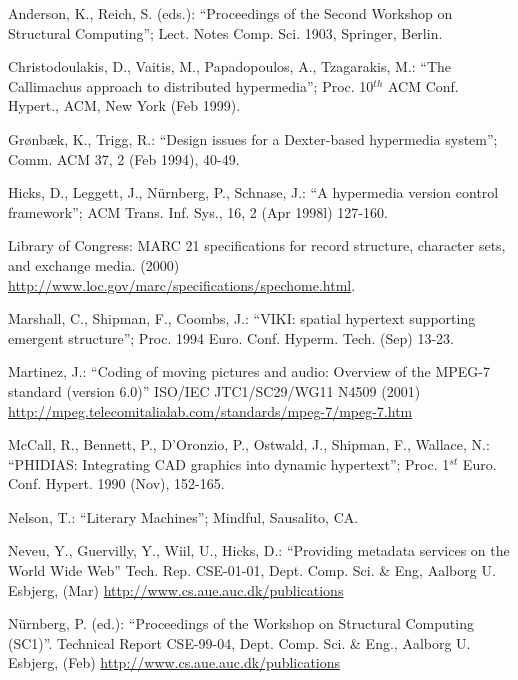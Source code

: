 \documentclass[10pt, a4paper, oneside]{article}
\begin{document}
\begin{thebibliography}{}{
\fontsize{9pt}{10pt}\selectfont

 Anderson, K., Reich,
S. (eds.): ``Proceedings of the Second Workshop on Structural Computing''; Lect. Notes Comp. Sci. 1903, Springer, Berlin.

 Christodoulakis,
D., Vaitis, M., Papadopoulos, A., Tzagarakis, M.: ``The Callimachus
approach to distributed hypermedia''; Proc. 10$^{th}$ ACM
Conf. Hypert., ACM, New York (Feb 1999).

 Gr{\o}nb{\ae}k, K.,
Trigg, R.: ``Design issues for a Dexter-based hypermedia system'';
Comm. ACM 37, 2 (Feb 1994), 40-49.

 Hicks, D., Leggett, J.,
N\"{u}rnberg, P., Schnase, J.: ``A hypermedia version control
framework''; ACM Trans. Inf. Sys., 16, 2 (Apr 1998l) 127-160.

 Library of Congress: MARC 21 specifications
for record structure, character sets, and exchange media. (2000)
\url{http://www.loc.gov/marc/specifications/spechome.html}.

 Marshall, C., Shipman, F.,
Coombs, J.: ``VIKI: spatial hypertext supporting emergent structure'';
Proc. 1994 Euro. Conf. Hyperm. Tech. (Sep) 13-23.

 Martinez, J.: ``Coding of moving
pictures and audio: Overview of the MPEG-7 standard (version 6.0)''
ISO/IEC JTC1/SC29/WG11 N4509 (2001)
\url{http://mpeg.telecomitalialab.com/standards/mpeg-7/mpeg-7.htm}

 McCall, R., Bennett, P.,
D'Oronzio, P., Ostwald, J., Shipman, F., Wallace, N.: ``PHIDIAS:
Integrating CAD graphics into dynamic hypertext''; Proc. 1$^{st}$
Euro. Conf. Hypert. 1990 (Nov), 152-165.

 Nelson, T.: ``Literary Machines'';
Mindful, Sausalito, CA.

 Neveu, Y., Guervilly, Y.,
Wiil, U., Hicks, D.: ``Providing metadata services on the World Wide
Web'' Tech. Rep. CSE-01-01, Dept. Comp. Sci. \& Eng, Aalborg
U. Esbjerg, (Mar) \url{http://www.cs.aue.auc.dk/publications}

 N\"{u}rnberg, P. (ed.):
``Proceedings of the Workshop on Structural Computing (SC1)''.
Technical Report CSE-99-04, Dept. Comp. Sci. \& Eng., Aalborg
U. Esbjerg, (Feb) \url{http://www.cs.aue.auc.dk/publications}

}
\end{thebibliography}
\end{document}
